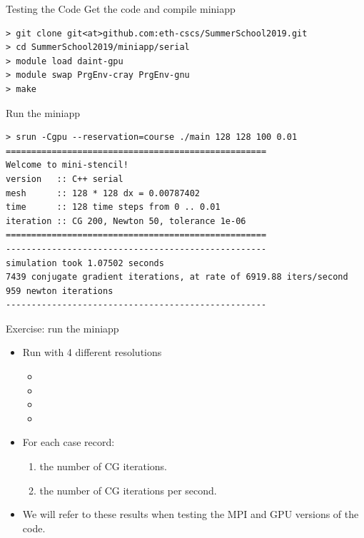 \documentclass[aspectratio=43]{beamer}
\begin{document}
\begin{frame}[fragile]{Testing the Code}
    Get the code and compile miniapp
\begin{lstlisting}[style=terminal]
> git clone git<at>github.com:eth-cscs/SummerSchool2019.git
> cd SummerSchool2019/miniapp/serial
> module load daint-gpu
> module swap PrgEnv-cray PrgEnv-gnu
> make
\end{lstlisting}
    Run the miniapp
\begin{lstlisting}[style=terminal]
> srun -Cgpu --reservation=course ./main 128 128 100 0.01
===================================================
Welcome to mini-stencil!
version   :: C++ serial
mesh      :: 128 * 128 dx = 0.00787402
time      :: 128 time steps from 0 .. 0.01
iteration :: CG 200, Newton 50, tolerance 1e-06
===================================================
---------------------------------------------------
simulation took 1.07502 seconds
7439 conjugate gradient iterations, at rate of 6919.88 iters/second
959 newton iterations
---------------------------------------------------
\end{lstlisting}
\end{frame}

\begin{frame}[fragile]{Exercise: run the miniapp}
    \begin{itemize}
        \item Run with 4 different resolutions
        \begin{itemize}
            \item {}
            \item {}
            \item {}
            \item {}
        \end{itemize}
        \item For each case record:
        \begin{enumerate}
            \item the number of CG iterations.
            \item the number of CG iterations per second.
        \end{enumerate}
        \item We will refer to these results when testing the MPI and GPU versions of the code.
    \end{itemize}
\end{frame}
\end{document}
